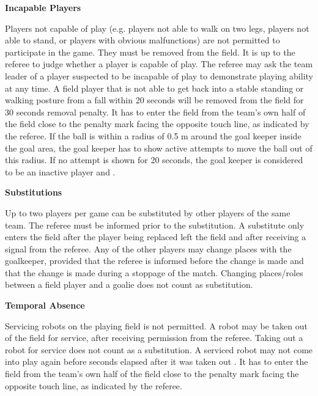 \bigskip

{\bfseries Incapable Players}

Players not capable of play (e.g. players not able to walk on two legs, players not able to stand, or players with obvious malfunctions) are not permitted to participate in the game. They must be removed from the field. It is up to the referee to judge whether a player is capable of play. The referee may ask the team leader of a player suspected to be incapable of play to demonstrate playing ability at any time. A field player that is not able to get back into a stable standing or walking posture from a fall within 20 seconds will be removed from the field for 30 seconds removal penalty. It has to enter the field from the team's own half of the field close to the penalty mark facing the opposite touch line, as indicated by the referee. If the ball is within a radius of 0.5 m around the goal keeper inside the goal area, the goal keeper has to show active attempts to move the ball out of this radius. If no attempt is shown for 20 seconds, the goal keeper is considered to be an inactive player and  .

\bigskip

{\bfseries Substitutions}

Up to two players per game can be substituted by other players of the same team.  The referee must be informed prior to the substitution. A substitute only enters the field after the player being replaced left the field and after receiving a signal from the referee. Any of the
other players may change places with the goalkeeper, provided that the referee is informed before the change is made and that the change is made during a stoppage of the match. Changing places/roles between a
field player and a goalie does not count as substitution.

\bigskip

{\bfseries Temporal Absence}

Servicing robots on the playing field is not permitted. A robot may be taken out of the field for service, after receiving permission from the referee. Taking out a robot for service does not count as a substitution. A serviced robot may not come into play again before   seconds elapsed after it was taken out . It has to enter the field from the team's own half of the field close to the penalty mark facing the opposite touch line, as indicated by the referee. 

